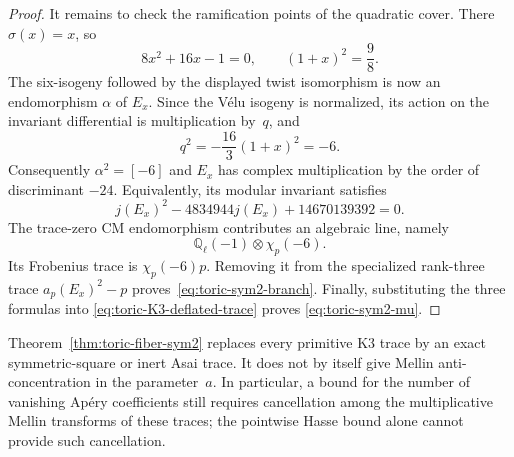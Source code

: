 \begin{proof}
It remains to check the ramification points of the quadratic cover.  There
$\sigma(x)=x$, so
\begin{equation}
 8x^2+16x-1=0,
 \qquad (1+x)^2=\frac98.
 \label{eq:toric-sym2-branch-fixed}
\end{equation}
The six-isogeny followed by the displayed twist isomorphism is now an
endomorphism $\alpha$ of $E_x$.  Since the V\'elu isogeny is normalized, its
action on the invariant differential is multiplication by~$q$, and
\[
 q^2=-\frac{16}{3}(1+x)^2=-6.
\]
Consequently $\alpha^2=[-6]$ and $E_x$ has complex multiplication by the
order of discriminant $-24$.  Equivalently, its modular invariant satisfies
\[
 j(E_x)^2-4834944j(E_x)+14670139392=0.
\]
The trace-zero CM endomorphism contributes an algebraic line, namely
\[
 \mathbb Q_\ell(-1)\otimes\chi_p(-6).
\]
Its Frobenius trace is $\chi_p(-6)p$.  Removing it from the specialized
rank-three trace
$a_p(E_x)^2-p$ proves~\eqref{eq:toric-sym2-branch}.
Finally, substituting the three formulas into
\eqref{eq:toric-K3-deflated-trace} proves
\eqref{eq:toric-sym2-mu}.
\end{proof}

\begin{remark}
\label{rem:toric-sym2-Mellin-limit}
Theorem~\ref{thm:toric-fiber-sym2} replaces every primitive K3 trace by an
exact symmetric-square or inert Asai trace.  It does not by itself give
Mellin anti-concentration in the parameter~$a$.  In particular, a bound for
the number of vanishing Ap\'ery coefficients still requires cancellation
among the multiplicative Mellin transforms of these traces; the pointwise
Hasse bound alone cannot provide such cancellation.
\end{remark}
